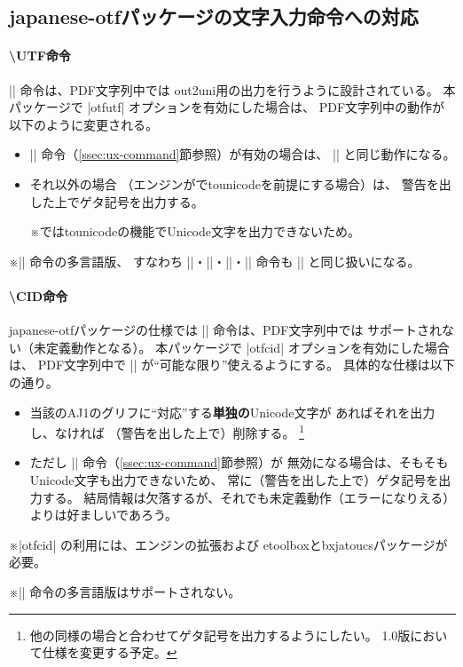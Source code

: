\documentclass[uplatex,dvipdfmx,a4paper]{jsarticle}
\newcommand{\Pkg}[1]{\textsf{#1}}
\newcommand{\Note}{\par\noindent ※}
\begin{document}
\subsection{\Pkg{japanese-otf}パッケージの文字入力命令への対応}
\label{ssec:otf-package}

\paragraph{\textbackslash UTF命令}
|\UTF| 命令は、PDF文字列中では
out2uni用の出力を行うように設計されている。
本パッケージで |otfutf| オプションを有効にした場合は、
PDF文字列中の動作が以下のように変更される。

\begin{itemize}
\item |\Ux| 命令（\ref{ssec:ux-command}節参照）が有効の場合は、
  |\Ux| と同じ動作になる。
\item それ以外の場合
  （エンジンが{\pLaTeX}でtounicodeを前提にする場合）は、
  警告を出した上でゲタ記号を出力する。
  \Note {\pLaTeX}ではtounicodeの機能でUnicode文字を出力できないため。
\end{itemize}

\Note |\UTF| 命令の多言語版、
すなわち |\UTFC|・|\UTFK|・|\UTFM|・|\UTFT| 命令も |\UTF|
と同じ扱いになる。

\paragraph{\textbackslash CID命令}
\Pkg{japanese-otf}パッケージの仕様では |\CID| 命令は、PDF文字列中では
サポートされない（未定義動作となる）。
本パッケージで |otfcid| オプションを有効にした場合は、
PDF文字列中で |\CID| が“可能な限り”使えるようにする。
具体的な仕様は以下の通り。

\begin{itemize}
\item 当該のAJ1のグリフに“対応”する\textbf{単独の}Unicode文字が
  あればそれを出力し、なければ
  （警告を出した上で）削除する。
  \footnote{他の同様の場合と合わせてゲタ記号を出力するようにしたい。
    1.0版において仕様を変更する予定。}
\item ただし |\Ux| 命令（\ref{ssec:ux-command}節参照）が
  無効になる場合は、そもそもUnicode文字も出力できないため、
  常に（警告を出した上で）ゲタ記号を出力する。
  結局情報は欠落するが、それでも未定義動作（エラーになりえる）
  よりは好ましいであろう。
\end{itemize}

\Note |otfcid| の利用には、エンジンの{\eTeX}拡張および
\Pkg{etoolbox}と\Pkg{bxjatoucs}パッケージが必要。
\Note |\CID| 命令の多言語版はサポートされない。
\end{document}
